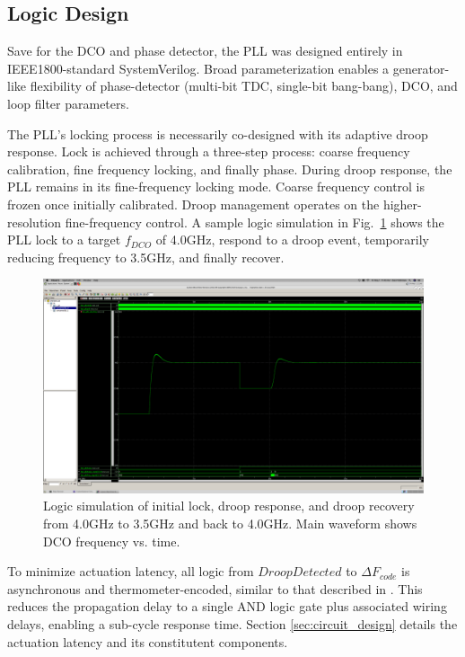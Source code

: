 \documentclass[twoside,9pt,journal,letterpage]{IEEEtran}
\begin{document}
\vspace{-3pt}
\subsection{Logic Design}
\label{sec:logic_design}

Save for the DCO and phase detector, the PLL was designed entirely in IEEE1800-standard SystemVerilog. Broad parameterization enables a generator-like flexibility of phase-detector (multi-bit TDC, single-bit bang-bang), DCO, and loop filter parameters. 

The PLL's locking process is necessarily co-designed with its adaptive droop response. Lock is achieved through a three-step process: coarse frequency calibration, fine frequency locking, and finally phase. During droop response, the PLL remains in its fine-frequency locking mode. Coarse frequency control is frozen once initially calibrated. Droop management operates on the higher-resolution fine-frequency control. A sample logic simulation in Fig.\ \ref{fig:brake} shows the PLL lock to a target $f_{DCO}$ of 4.0GHz, respond to a droop event, temporarily reducing frequency to 3.5GHz, and finally recover. 

\begin{figure}[h]
	\centering
	\includegraphics[width=0.8\columnwidth]{brake1.png}
	\caption{Logic simulation of initial lock, droop response, and droop recovery from 4.0GHz to 3.5GHz and back to 4.0GHz. Main waveform shows DCO frequency vs. time.}
	\label{fig:brake}
\end{figure}

To minimize actuation latency, all logic from $DroopDetected$ to $\Delta F_{code}$ is asynchronous and thermometer-encoded, similar to that described in \cite{hashimoto2018}. This reduces the propagation delay to a single AND logic gate plus associated wiring delays, enabling a sub-cycle response time. Section \ref{sec:circuit_design} details the actuation latency and its constitutent components. 
\end{document}
